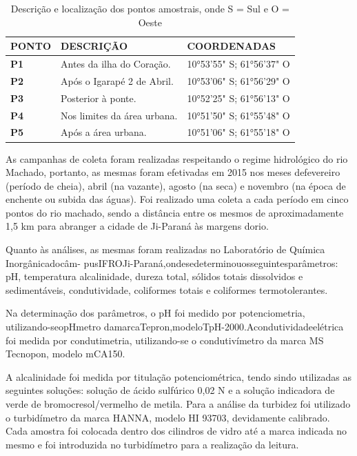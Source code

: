 \documentclass[article,12pt,onesidea,4paper,english,brazil]{abntex2}
\begin{document}
\begin{table}[h]
	\centering
	\caption{Descrição e localização dos pontos amostrais, onde S = Sul e O = Oeste}
	\label{my-label}
	\begin{tabular}{|l|l|l|}
		\hline
		\textbf{PONTO} & \textbf{DESCRIÇÃO}          & \textbf{COORDENADAS}     \\ \hline
		\textbf{P1}    & Antes da ilha do Coração.   & 10°53'55" S; 61°56'37" O \\ \hline
		\textbf{P2}    & Após o Igarapé 2 de Abril.  & 10°53'06" S; 61°56'29" O \\ \hline
		\textbf{P3}    & Posterior à ponte.          & 10°52'25" S; 61°56'13" O \\ \hline
		\textbf{P4}    & Nos limites da área urbana. & 10°51'50" S; 61°55'48" O \\ \hline
		\textbf{P5}    & Após a área urbana.         & 10°51'06" S; 61°55'18" O \\ \hline
	\end{tabular}
\end{table}
As campanhas de coleta foram realizadas respeitando o regime hidrológico do rio Machado, portanto, as mesmas foram efetivadas em 2015 nos meses defevereiro (período de cheia), abril (na vazante), agosto (na seca) e novembro (na época de enchente ou subida das águas). Foi realizado uma coleta a cada período em cinco pontos do rio machado, sendo a distância entre os mesmos de aproximadamente 1,5 km para abranger a cidade de Ji-Paraná às margens dorio.

Quanto às análises, as mesmas foram realizadas no Laboratório de Química Inorgânicadocâm-
pusIFROJi-Paraná,ondesedeterminouosseguintesparâmetros: pH, temperatura alcalinidade, dureza total, sólidos totais dissolvidos e sedimentáveis, condutividade, coliformes totais e coliformes termotolerantes.

Na determinação dos parâmetros, o pH foi medido por potenciometria, utilizando-seopHmetro
damarcaTepron,modeloTpH-2000.Acondutividadeelétrica foi medida por condutimetria, utilizando-se o condutivímetro da marca MS Tecnopon, modelo mCA150.

A alcalinidade foi medida por titulação potenciométrica, tendo sindo utilizadas as seguintes soluções: solução de ácido sulfúrico 0,02 N e a solução indicadora de verde de bromocresol/vermelho de metila. Para a análise da turbidez foi utilizado o turbidímetro da marca HANNA, modelo HI 93703, devidamente calibrado. Cada amostra foi colocada dentro dos cilindros de vidro até a marca indicada no mesmo e foi introduzida no turbidímetro para a realização da leitura.
\end{document}
